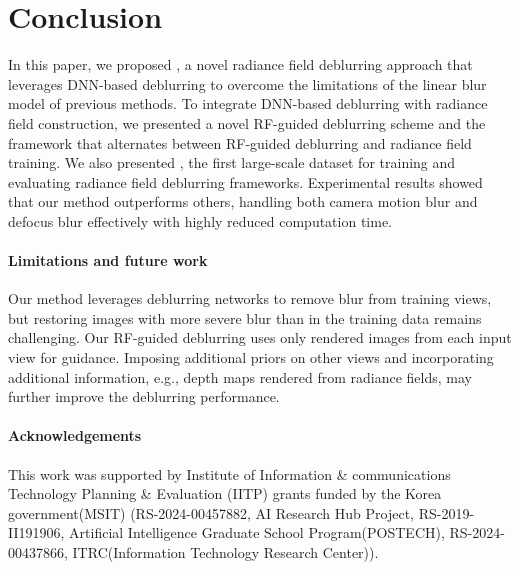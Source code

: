 \section{Conclusion}
\label{sec:conclusion}
In this paper, we proposed \MethodName{}, a novel radiance field deblurring approach that leverages DNN-based deblurring to overcome the limitations of the linear blur model of previous methods.
To integrate DNN-based deblurring with radiance field construction, we presented a novel RF-guided deblurring scheme and the framework that alternates between RF-guided deblurring and radiance field training.
We also presented \SynthDataName{}, the first large-scale dataset for training and evaluating radiance field deblurring frameworks.
Experimental results showed that our method outperforms others, handling both camera motion blur and defocus blur effectively with highly reduced computation time.

\paragraph{Limitations and future work}
Our method leverages deblurring networks to remove blur from training views, but restoring images with more severe blur than in the training data remains challenging. 
Our RF-guided deblurring uses only rendered images from each input view for guidance. 
Imposing additional priors on other views and incorporating additional information, e.g., depth maps rendered from radiance fields, may further improve the deblurring performance.

\paragraph{Acknowledgements}
This work was supported by Institute of Information \& communications Technology Planning \& Evaluation (IITP) grants funded by the Korea government(MSIT) (RS-2024-00457882, AI Research Hub Project, RS-2019-II191906, Artificial Intelligence Graduate School Program(POSTECH), RS-2024-00437866, ITRC(Information Technology Research Center)).